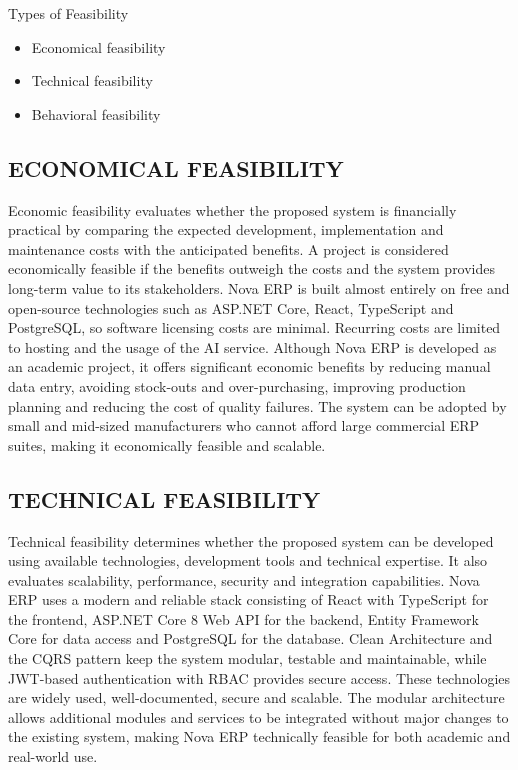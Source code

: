\documentclass[12pt,a4paper]{report}
\begin{document}
Types of Feasibility
\begin{itemize}
\item Economical feasibility
\item Technical feasibility
\item Behavioral feasibility
\end{itemize}

\subsection{ECONOMICAL FEASIBILITY}
Economic feasibility evaluates whether the proposed system is financially practical by comparing the expected development, implementation and maintenance costs with the anticipated benefits. A project is considered economically feasible if the benefits outweigh the costs and the system provides long-term value to its stakeholders. Nova ERP is built almost entirely on free and open-source technologies such as ASP.NET Core, React, TypeScript and PostgreSQL, so software licensing costs are minimal. Recurring costs are limited to hosting and the usage of the AI service. Although Nova ERP is developed as an academic project, it offers significant economic benefits by reducing manual data entry, avoiding stock-outs and over-purchasing, improving production planning and reducing the cost of quality failures. The system can be adopted by small and mid-sized manufacturers who cannot afford large commercial ERP suites, making it economically feasible and scalable.

\subsection{TECHNICAL FEASIBILITY}
Technical feasibility determines whether the proposed system can be developed using available technologies, development tools and technical expertise. It also evaluates scalability, performance, security and integration capabilities. Nova ERP uses a modern and reliable stack consisting of React with TypeScript for the frontend, ASP.NET Core 8 Web API for the backend, Entity Framework Core for data access and PostgreSQL for the database. Clean Architecture and the CQRS pattern keep the system modular, testable and maintainable, while JWT-based authentication with RBAC provides secure access. These technologies are widely used, well-documented, secure and scalable. The modular architecture allows additional modules and services to be integrated without major changes to the existing system, making Nova ERP technically feasible for both academic and real-world use.
\end{document}

